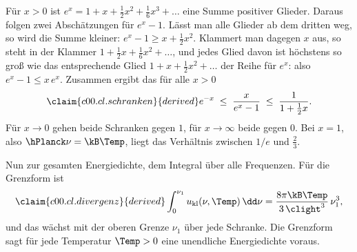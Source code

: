 \begin{vertiefung}[id=c00.v1,
    titel={Die Grenzform, genau genommen},
    wozu={Der Kern sagt, das Verhältnis $x/(e^x-1)$ liege für kleine $x$ nahe bei $1$ und
      falle für große $x$ gegen $0$. Hier stehen zwei Schranken, die das beweisen, und
      eine Folgerung: Die Grenzform sagt eine unendliche Energiedichte voraus, das
      Strahlungsgesetz eine endliche.},
    voraussetzung={Kern bis Gleichung~\eqref{c00.eq.grenzform}; die Exponentialreihe und
      Integrale von Potenzen. Der Rest des Kapitels braucht diesen Block nicht.},
    zurueck={Für $\hPlanck\nu$ klein gegen $\kB\Temp$ stimmen Strahlungsgesetz und
      Grenzform näherungsweise überein, ihr Verhältnis geht gegen $1$; für große Frequenzen
      ist die Grenzform falsch, und zwar beliebig falsch.}]
  Für $x > 0$ ist $e^x = 1 + x + \tfrac12 x^2 + \tfrac16 x^3 + \dots$ eine Summe positiver
  Glieder. Daraus folgen zwei Abschätzungen für $e^x - 1$. Lässt man alle Glieder ab dem
  dritten weg, so wird die Summe kleiner: $e^x - 1 \geq x + \tfrac12 x^2$. Klammert man
  dagegen $x$ aus, so steht in der Klammer $1 + \tfrac12 x + \tfrac16 x^2 + \dots$, und
  jedes Glied davon ist höchstens so groß wie das entsprechende Glied
  $1 + x + \tfrac12 x^2 + \dots$ der Reihe für $e^x$: also $e^x - 1 \leq x\,e^x$.
  Zusammen ergibt das für alle $x > 0$
  \begin{equation}\label{c00.eq.schranken}\claim{c00.cl.schranken}{derived}
    e^{-x} \;\leq\; \frac{x}{e^{x} - 1} \;\leq\; \frac{1}{1 + \tfrac12 x} .
  \end{equation}
  Für $x \to 0$ gehen beide Schranken gegen $1$, für $x \to \infty$ beide gegen $0$. Bei
  $x = 1$, also $\hPlanck\nu = \kB\Temp$, liegt das Verhältnis zwischen $1/e$ und
  $\tfrac23$.

  Nun zur gesamten Energiedichte, dem Integral über alle Frequenzen. Für die Grenzform ist
  \begin{equation}\label{c00.eq.divergenz}\claim{c00.cl.divergenz}{derived}
    \int_0^{\nu_1} u_{\mathrm{kl}}(\nu, \Temp)\,\dd\nu
    = \frac{8\pi \kB \Temp}{3\,\clight^3}\,\nu_1^3 ,
  \end{equation}
  und das wächst mit der oberen Grenze $\nu_1$ über jede Schranke. Die Grenzform sagt für
  jede Temperatur $\Temp > 0$ eine unendliche Energiedichte voraus.


\end{vertiefung}
